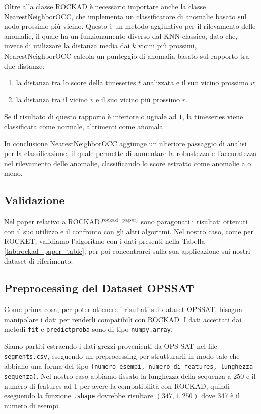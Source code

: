 Oltre alla classe ROCKAD è necessario importare anche la classe NearestNeighborOCC, che implementa un classificatore di anomalie basato sul nodo prossimo più vicino.
Questo è un metodo aggiuntivo per il rilevamento delle anomalie, il quale ha un funzionamento diverso dal KNN classico, dato che, invece di utilizzare la distanza media dai $k$ vicini più prossimi, NearestNeighborOCC calcola un punteggio di anomalia basato sul rapporto tra due distanze:
\begin{enumerate}
    \item la distanza tra lo score della timeseries $t$ analizzata e il suo vicino prossimo $v$;
    \item la distanza tra il vicino $v$ e il suo vicino più prossimo $r$.
\end{enumerate}
Se il risultato di questo rapporto è inferiore o uguale ad $1$, la timeseries viene classificata come normale, altrimenti come anomala.

In conclusione NearestNeighborOCC aggiunge un ulteriore passaggio di analisi per la classificazione, il quale permette di aumentare la robustezza e l'accuratezza nel rilevamento delle anomalie, classificando lo score estratto come anomalie a o meno.
\subsection{Validazione}
Nel paper relativo a ROCKAD$^{\text{\cite{rockad_paper}}}$ sono paragonati i risultati ottenuti con il suo utilizzo e il confronto con gli altri algoritmi. Nel nostro caso, come per  ROCKET, validiamo l'algoritmo con i dati presenti nella Tabella \ref{tab:rockad_paper_table}, per poi concentrarci sulla sua applicazione sui nostri dataset di riferimento.


\pagebreak

\subsection{Preprocessing del Dataset OPS\textunderscore SAT}
Come prima cosa, per poter ottenere i risultati sul dataset OPS\textunderscore SAT, bisogna manipolare i dati per renderli compatibili con ROCKAD.
I dati accettati dai metodi \texttt{fit} e \texttt{predict\textunderscore proba} sono di tipo \texttt{numpy.array}.

Siamo partiti estraendo i dati grezzi provenienti da OPS-SAT nel file \\ \texttt{segments.csv}, eseguendo un preprocessing per strutturarli in modo tale che abbiano una forma del tipo  \texttt{(numero esempi, numero di features, lunghezza sequenza)}. Nel nostro caso abbiamo fissato la lunghezza della sequenza a $250$ e il numero di features ad 1 per avere la compatibilità con ROCKAD, quindi eseguendo la funzione \texttt{.shape} dovrebbe risultare $(347, 1, 250)$ dove 347 è il numero di esempi.


